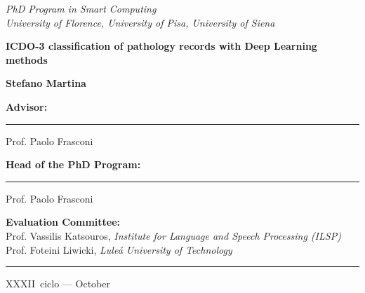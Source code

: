 \documentclass[a4paper,12pt]{memoir}
\def\candidate{Stefano Martina} %
\def\thesistitle{ICDO-3 classification of pathology records with Deep
  Learning methods} %
\def\advisor{Prof. Paolo Frasconi}
\def\headphdprogram{Prof. Paolo Frasconi}
\def\refereeone{\textnormal{Prof. Vassilis Katsouros}, \textit{Institute for Language and Speech Processing (ILSP)}}
\def\refereetwo{\textnormal{Prof. Foteini Liwicki}, \textit{Lule{\aa} University of Technology}}
\def\ciclo{XXXII}
\begin{document}
\newpage
{}
{%
  \noindent
  \textit{PhD Program in Smart Computing}\\
  \textit{University of Florence, University of Pisa, University of Siena}

  \vfill
  \noindent
  {\fontsize{32}{38}\selectfont \textbf{\nohyphens{\thesistitle}}\par}
  \vfill
  \noindent
  {\Large \textbf{\candidate}}
}
\vfill
{
  \noindent
  \begin{minipage}{0.4\linewidth}
    \noindent
    {\textbf{Advisor:}}\\
    \vspace{7mm}
    \hrule
    \vspace{2mm}
    \advisor
  \end{minipage}

  \vspace{15mm}
  \noindent
  \begin{minipage}{0.4\linewidth}
    \noindent
    {\textbf{Head of the PhD Program:}}\\
    \vspace{7mm}
    \hrule
    \vspace{2mm}
    \headphdprogram
  \end{minipage}

  \vspace{15mm}

  \noindent
  {\textbf{Evaluation Committee:}}\\
  \refereeone\\
  \refereetwo
}

\begin{center}
  \rule{\linewidth}{0.5mm}
  \ciclo\ ciclo --- October \number\the\year
\end{center}
\thispagestyle{empty}\null\vfil
\end{document}
